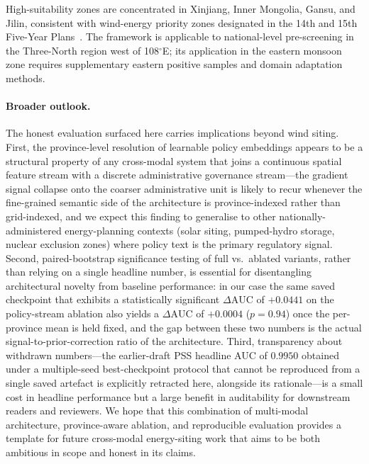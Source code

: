 \documentclass[12pt, a4paper]{article}
\begin{document}
High-suitability zones are concentrated in Xinjiang, Inner
Mongolia, Gansu, and Jilin, consistent with wind-energy
priority zones designated in the 14th and 15th Five-Year
Plans~\cite{ndrc2022,ndrc2026,he2023,zhong2022}. The
framework is applicable to national-level pre-screening in
the Three-North region west of 108$^\circ$E; its
application in the eastern monsoon zone requires
supplementary eastern positive samples and domain
adaptation methods.

\paragraph{Broader outlook.}
The honest evaluation surfaced here carries implications
beyond wind siting. First, the province-level resolution of
learnable policy embeddings appears to be a structural
property of any cross-modal system that joins a continuous
spatial feature stream with a discrete administrative
governance stream---the gradient signal collapse onto the
coarser administrative unit is likely to recur whenever the
fine-grained semantic side of the architecture is
province-indexed rather than grid-indexed, and we expect
this finding to generalise to other nationally-administered
energy-planning contexts (solar siting, pumped-hydro
storage, nuclear exclusion zones) where policy text is the
primary regulatory signal. Second, paired-bootstrap
significance testing of full vs.\ ablated variants, rather
than relying on a single headline number, is essential for
disentangling architectural novelty from baseline
performance: in our case the same saved checkpoint that
exhibits a statistically significant $\Delta\text{AUC}$ of
$+0.0441$ on the policy-stream ablation also yields a
$\Delta\text{AUC}$ of $+0.0004$ ($p=0.94$) once the
per-province mean is held fixed, and the gap between these
two numbers is the actual signal-to-prior-correction ratio
of the architecture. Third, transparency about withdrawn
numbers---the earlier-draft PSS headline AUC of $0.9950$
obtained under a multiple-seed best-checkpoint protocol that
cannot be reproduced from a single saved artefact is
explicitly retracted here, alongside its rationale---is a
small cost in headline performance but a large benefit in
auditability for downstream readers and reviewers. We hope
that this combination of multi-modal architecture,
province-aware ablation, and reproducible evaluation
provides a template for future cross-modal energy-siting
work that aims to be both ambitious in scope and honest in
its claims.

\appendix
\renewcommand{\thefigure}{A\arabic{figure}}
\setcounter{figure}{0}
\end{document}
